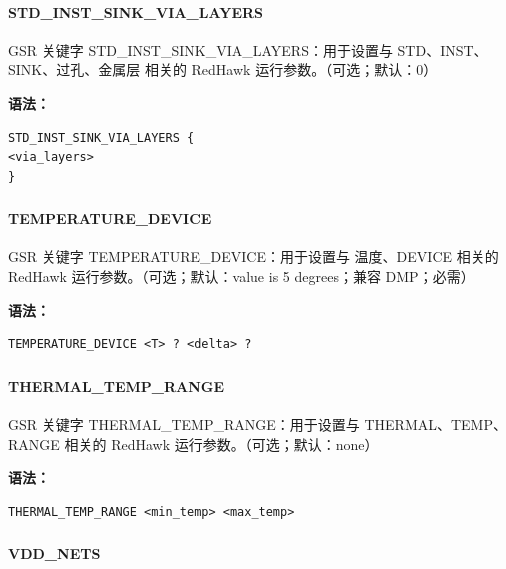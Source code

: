 \paragraph*{STD_INST_SINK_VIA_LAYERS}

GSR 关键字 STD_INST_SINK_VIA_LAYERS：用于设置与 STD、INST、SINK、过孔、金属层 相关的 RedHawk 运行参数。（可选；默认：0）

\textbf{语法：}
\begin{lstlisting}
STD_INST_SINK_VIA_LAYERS {
<via_layers>
}
\end{lstlisting}

\subsubsection{}
\paragraph*{TEMPERATURE_DEVICE}

GSR 关键字 TEMPERATURE_DEVICE：用于设置与 温度、DEVICE 相关的 RedHawk 运行参数。（可选；默认：value is 5 degrees；兼容 DMP；必需）

\textbf{语法：}
\begin{lstlisting}
TEMPERATURE_DEVICE <T> ? <delta> ?
\end{lstlisting}

\subsubsection{}
\paragraph*{THERMAL_TEMP_RANGE}

GSR 关键字 THERMAL_TEMP_RANGE：用于设置与 THERMAL、TEMP、RANGE 相关的 RedHawk 运行参数。（可选；默认：none）

\textbf{语法：}
\begin{lstlisting}
THERMAL_TEMP_RANGE <min_temp> <max_temp>
\end{lstlisting}

\subsubsection{}
\paragraph*{VDD_NETS}


